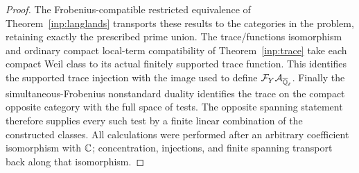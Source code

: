\begin{proof}
The Frobenius-compatible restricted equivalence of
Theorem~\ref{inp:langlands} transports these results to the categories
in the problem, retaining exactly the prescribed prime union.
The trace/functions isomorphism and ordinary compact local-term
compatibility of Theorem~\ref{inp:trace} take each compact Weil class
to its actual finitely supported trace function.  This identifies the
supported trace injection with the image used to define
$\mathcal F_Y\mathcal A_{\overline{\mathbb Q}_{\ell}}$.  Finally the simultaneous-Frobenius nonstandard duality
identifies the trace on the compact opposite category with the full
space of tests.  The opposite spanning statement therefore supplies
every such test by a finite linear combination of the constructed
classes.  All calculations were performed after an arbitrary
coefficient isomorphism with $\mathbb C$; concentration, injections, and finite
spanning transport back along that isomorphism.
\end{proof}
